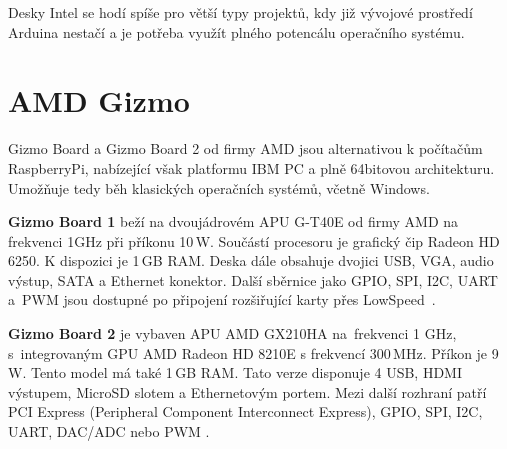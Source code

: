 Desky Intel se hodí spíše pro větší typy projektů, kdy již vývojové prostředí Arduina nestačí a je potřeba využít plného potencálu operačního systému.


 \section{AMD Gizmo}
\label{KapAMD}

	Gizmo Board a Gizmo Board 2 od firmy AMD jsou alternativou k počítačům RaspberryPi, nabízející však platformu IBM PC a plně 64bitovou architekturu. Umožňuje tedy běh klasických operačních systémů, včetně Windows.
	
		\textbf{Gizmo Board 1} beží na dvoujádrovém APU G-T40E od firmy AMD na frekvenci 1GHz při příkonu 10\,W. Součástí procesoru je grafický čip Radeon HD 6250. K dispozici je 1\,GB RAM. Deska dále obsahuje dvojici USB, VGA, audio výstup, SATA a Ethernet konektor. Další sběrnice jako GPIO, SPI, I2C, UART a~PWM jsou dostupné po připojení rozšiřující karty přes LowSpeed~\cite{AmdGizmo1}.
	
	\textbf{ Gizmo Board 2} je vybaven APU AMD GX210HA na~frekvenci 1 GHz, s~integrovaným GPU AMD Radeon HD 8210E s frekvencí 300\,MHz. Příkon je 9\,W. Tento model má také 1\,GB RAM. Tato verze disponuje 4 USB, HDMI výstupem, MicroSD slotem a Ethernetovým portem. Mezi další rozhraní patří PCI Express (Peripheral Component Interconnect Express), GPIO, SPI, I2C, UART, DAC/ADC nebo PWM \cite{AmdGizmo2}.


